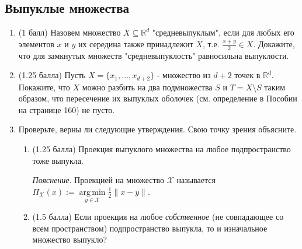 \documentclass[a5paper,twoside,russian,8pt]{article}
\DeclareMathOperator*{\argmin}{arg\,min}
\begin{document}
\subsection*{Выпуклые множества}
\begin{enumerate}[label=\textbf{Задача \arabic*.}]    
    \item (1 балл) Назовем множество $X \subseteq \mathbb{R}^d$ "средневыпуклым", если для любых его элементов $x$ и $y$ их середина также принадлежит $X$, т.е. $\frac{x + y}{2} \in X$. Докажите, что для замкнутых множеств "средневыпуклость" равносильна выпуклости.

    \item (1.25 балла) Пусть $X = \{x_1, \ldots, x_{d+2}\}$ - множество из $d + 2$ точек в $\mathbb{R}^d$. Покажите, что $X$ можно разбить на два подмножества $S$ и $T = X \setminus S$ таким образом, что пересечение их выпуклых оболочек (см. определение в Пособии на странице 160) не пусто.

    \item Проверьте, верны ли следующие утверждения. Свою точку зрения объясните.
    \begin{enumerate}
        \item (1.25 балла)
        Проекция выпуклого множества на любое подпространство тоже выпукла.

        \textit{Пояснение}. Проекцией на множество $\mathcal{X}$  называется  $\Pi_{\mathcal{X}}(x) := \argmin\limits_{y \in \mathcal{X}} \frac{1}{2} \|x - y\|$.

        \item (1.5 балла)
        Если проекция на любое \emph{собственное} (не совпадающее со всем пространством) подпространство выпукла, то и изначальное множество выпукло?
    \end{enumerate}
\end{enumerate}
\end{document}
